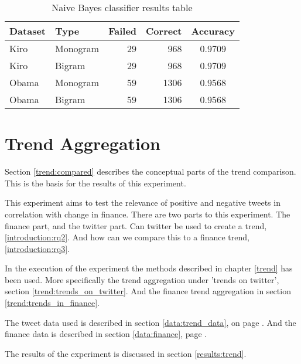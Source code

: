 \begin{table}
\centering
\label{tbl:naive_bayes_classification_results}
\caption{Naive Bayes classifier results table}
\begin{tabular}{ l l r r c }
Dataset & Type & Failed & Correct & Accuracy \\ 
\hline 
Kiro & Monogram & 29 & 968 & 0.9709 \\
Kiro & Bigram & 29 & 968 & 0.9709 \\
Obama & Monogram & 59 & 1306 & 0.9568 \\
Obama & Bigram & 59 & 1306 & 0.9568 \\
\end{tabular}
\end{table}
%

\section{Trend Aggregation}\label{experiments:trend}
Section \ref{trend:compared} describes the
conceptual parts of the trend comparison. This is the basis for the results of
this experiment. 

This experiment aims to test the relevance of positive and negative tweets in
correlation with change in finance. There are two parts to this experiment. The
finance part, and the twitter part. Can twitter be used to create a trend,
\ref{introduction:rq2}. And how can we compare this to a finance trend,
\ref{introduction:rq3}.

In the execution of the experiment the methods described in chapter \ref{trend}
has been used. More specifically the trend aggregation under 'trends on
twitter', section
\ref{trend:trends_on_twitter}. And the finance trend aggregation in
section \ref{trend:trends_in_finance}.

The tweet data used is described in section \ref{data:trend_data}, on page
\pageref{data:trend_data}. And the finance data is described in section
\ref{data:finance}, page \pageref{data:finance}.

The results of the experiment is discussed in section \ref{results:trend}. 
%
